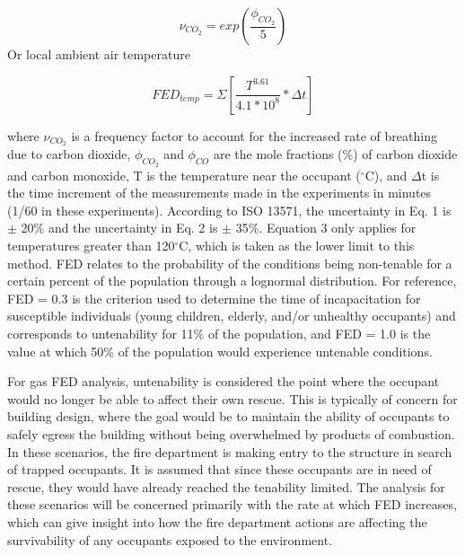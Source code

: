 \documentclass[12pt,oneside]{article}
\begin{document}
\begin{equation}\label{eqn:FED_vco2}\nu_{CO_2}=exp(\frac{\phi_{CO_2}}{5})\end{equation}
Or local ambient air temperature 

\begin{equation}\label{eqn:FED_temp}FED_{temp}=\Sigma[\frac{T^{3.61}}{4.1*10^8}*\Delta t]\end{equation}

where $\nu_{CO_2}$ is a frequency factor to account for the increased rate of breathing due to carbon dioxide, $\phi_{CO_2}$ and $\phi_{CO}$ are the mole fractions (\%) of carbon dioxide and carbon monoxide, T is the temperature near the occupant ($^{\circ}$C), and $\Delta$t is the time increment of the measurements made in the experiments in minutes (1/60 in these experiments).  According to ISO 13571, the uncertainty in Eq. 1 is $\pm$ 20\% and the uncertainty in Eq. 2 is $\pm$ 35\%.  Equation 3 only applies for temperatures greater than 120$^{\circ}$C, which is taken as the lower limit to this method. FED relates to the probability of the conditions being non-tenable for a certain percent of the population through a lognormal distribution.  For reference, FED = 0.3 is the criterion used to determine the time of incapacitation for susceptible individuals (young children, elderly, and/or unhealthy occupants) and corresponds to untenability for 11\% of the population, and FED = 1.0 is the value at which 50\% of the population would experience untenable conditions.

For gas FED analysis, untenability is considered the point where the occupant would no longer be able to affect their own rescue. This is typically of concern for building design, where the goal would be to maintain the ability of occupants to safely egress the building without being overwhelmed by products of combustion. In these scenarios, the fire department is making entry to the structure in search of trapped occupants. It is assumed that since these occupants are in need of rescue, they would have already reached the tenability limited. The analysis for these scenarios will be concerned primarily with the rate at which FED increases, which can give insight into how the fire department actions are affecting the survivability of any occupants exposed to the environment.
\end{document}
